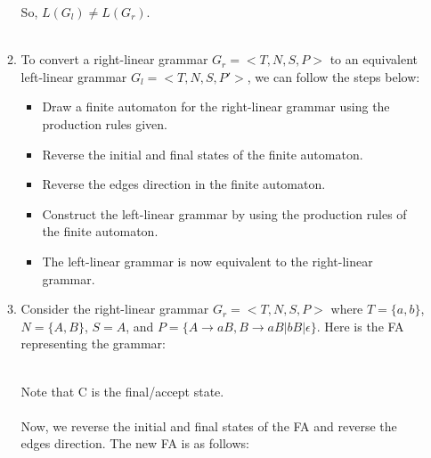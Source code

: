 \documentclass[a4paper]{article}
\begin{document}
\begin{enumerate}
\begin{enumerate}
            So, $L(G_l) \neq L(G_r)$. \\ \\

            \item To convert a right-linear grammar $G_r = <T, N, S, P>$ to an equivalent left-linear grammar $G_l = <T, N, S, P'>$, we can follow the steps below:\\
            \begin{itemize}
                \item Draw a finite automaton for the right-linear grammar using the production rules given.
                \item Reverse the initial and final states of the finite automaton.
                \item Reverse the edges direction in the finite automaton.
                \item Construct the left-linear grammar by using the production rules of the finite automaton.
                \item The left-linear grammar is now equivalent to the right-linear grammar. \\
            \end{itemize}

            \item Consider the right-linear grammar $G_r = <T, N, S, P>$ where $T = \{a, b\}$, $N = \{A, B\}$, $S = A$, and $P = \{A \rightarrow aB, B \rightarrow aB | bB | \epsilon\}$. Here is the FA representing the grammar:\\ \\

            Note that C is the final/accept state. \\ \\

            Now, we reverse the initial and final states of the FA and reverse the edges direction. The new FA is as follows:\\ \\


\end{enumerate}
\end{enumerate}
\end{document}
